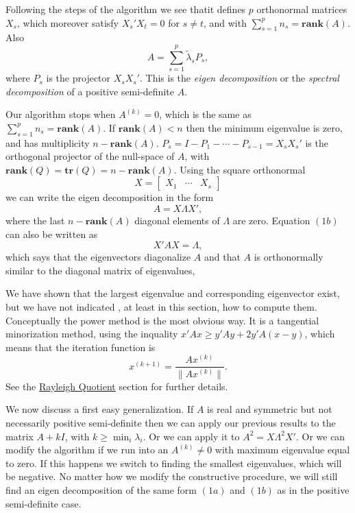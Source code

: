 \documentclass[
  12pt,
]{book}
\begin{document}
Following the steps of the algorithm we see thatit defines \(p\) orthonormal matrices \(X_s\), which moreover satisfy \(X_s'X_t=0\) for \(s\not= t\), and with \(\sum_{s=1}^p n_s=\mathbf{rank}(A)\). Also
\[
A=\sum_{s=1}^p \tilde\lambda_sP_s,\tag{1a}
\]
where \(P_s\) is the projector \(X_sX_s'\). This is the
\emph{eigen decomposition} or the \emph{spectral decomposition} of a positive
semi-definite \(A\).

Our algorithm stops when \(A^{(k)}=0\), which is the same as \(\sum_{s=1}^p n_s=\mathbf{rank}(A)\). If \(\mathbf{rank}(A)<n\)
then the minimum eigenvalue is zero, and has multiplicity \(n-\mathbf{rank}(A)\). \(P_s=I-P_1-\cdots-P_{s-1}=X_sX_s'\) is the orthogonal projector of the null-space of \(A\), with \(\mathbf{rank}(Q)=\mathbf{tr}(Q)=n-\mathbf{rank}(A)\). Using the
square orthonormal
\[
X=\begin{bmatrix}X_1&\cdots&X_s\end{bmatrix}
\]
we can write the eigen decomposition in the form
\[
A=X\Lambda X',\tag{1b}
\]
where the last \(n-\mathbf{rank}(A)\) diagonal elements of \(\Lambda\) are zero. Equation \((1b)\) can also be written as
\[
X'AX=\Lambda,\tag{1c}
\]
which says that the eigenvectors diagonalize \(A\) and that \(A\) is orthonormally similar to the diagonal matrix of eigenvalues,

We have shown that the largest eigenvalue and corresponding eigenvector exist, but we have not indicated , at least in this section, how to compute them. Conceptually the power method is the most obvious way. It is a tangential minorization method, using the inquality \(x'Ax\geq y'Ay+2y'A(x-y)\), which means that
the iteration function is
\[
x^{(k+1)}=\frac{Ax^{(k)}}{\|Ax^{(k)}\|}.
\]
See the \href{../inequalities/rayleigh.html}{Rayleigh Quotient} section for further details.

We now discuss a first easy generalization. If \(A\) is real and symmetric but not necessarily positive semi-definite then we can apply our previous results to the matrix \(A+kI\), with \(k\geq\min_i\lambda_i\). Or we can apply it to \(A^2=X\Lambda^2X'\). Or we can modify the algorithm if we run into an \(A^{(k)}\not= 0\) with maximum eigenvalue equal to zero. If this happens we switch to finding the smallest eigenvalues, which will be negative. No matter how we modify the constructive procedure, we will still find an eigen decomposition of the same form \((1a)\) and \((1b)\) as in the positive semi-definite case.
\end{document}
